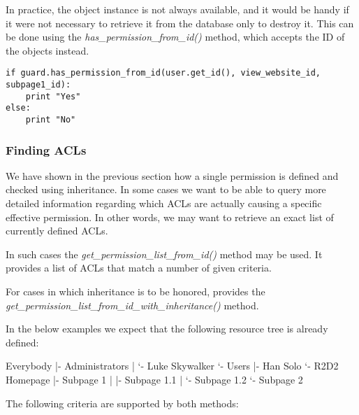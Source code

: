 In practice, the object instance is not always available, and it would be 
handy if it were not necessary to retrieve it from the database only to 
destroy it. This can be done using the 
{\it has\_permission\_from\_id()} method, which accepts the ID of the objects 
instead.

\begin{lstlisting}
if guard.has_permission_from_id(user.get_id(), view_website_id, subpage1_id):
    print "Yes"
else:
    print "No"
\end{lstlisting}


\subsubsection{Finding ACLs}

We have shown in the previous section how a single permission is defined 
and checked using inheritance. In some cases we want to be able to query 
more detailed information regarding which ACLs are actually causing a 
specific effective permission. In other words, we may want to retrieve 
an exact list of currently defined ACLs.

In such cases the {\it get\_permission\_list\_from\_id()} method may be 
used. It provides a list of ACLs that match a number of given criteria.


For cases in which inheritance is to be honored, \product provides the 
{\it get\_permission\_list\_from\_id\_with\_inheritance()} method.

In the below examples we expect that the following resource tree is 
already defined:

\begin{indentverb}
Everybody
  |- Administrators
  |   `- Luke Skywalker
  `- Users
      |- Han Solo
      `- R2D2
Homepage
  |- Subpage 1
  |   |- Subpage 1.1
  |   `- Subpage 1.2
  `- Subpage 2
\end{indentverb}

The following criteria are supported by both methods:

